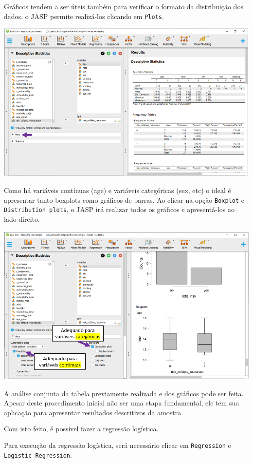\documentclass[
]{book}
\begin{document}
Gráficos tendem a ser úteis também para verificar o formato da distribuição dos dados. o JASP permite realizá-los clicando em \texttt{Plots}.

\includegraphics{./img/cap_logistica_plots.png}

Como há variáveis contínuas (age) e variáveis categóricas (sex, etc) o ideal é apresentar tanto boxplots como gráficos de barras. Ao clicar na opção \texttt{Boxplot} e \texttt{Distribution\ plots}, o JASP irá realizar todos os gráficos e apresentá-los ao lado direito.

\includegraphics{./img/cap_logistica_plots2.png}

A análise conjunta da tabela previamente realizada e dos gráficos pode ser feita. Apesar deste procedimento inicial não ser uma etapa fundamental, ele tem sua aplicação para apresentar resultados descritivos da amostra.

Com isto feito, é possível fazer a regressão logística.

Para execução da regressão logística, será necessário clicar em \texttt{Regression} e \texttt{Logistic\ Regression}.
\end{document}
